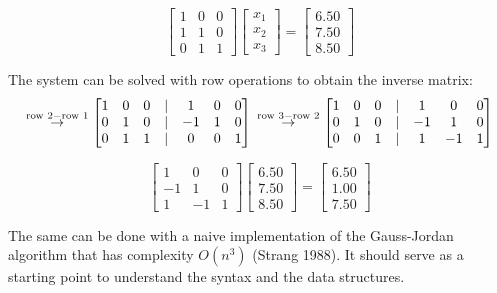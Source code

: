 \begin{equation*}
\begin{bmatrix}
1 & 0 & 0 \\
1 & 1 & 0 \\
0 & 1 & 1
\end{bmatrix}
\begin{bmatrix}
x_1 \\
x_2 \\
x_3
\end{bmatrix}
=
\begin{bmatrix}
6.50 \\
7.50 \\
8.50
\end{bmatrix}
\end{equation*}

The system can be solved with row operations to obtain the inverse matrix:
\begin{equation*}
\overset{\text{row 2} - \text{row 1}}{\rightarrow} \begin{bmatrix}
1 & 0 & 0 & | & 1 & 0 & 0 \\
0 & 1 & 0 & | & -1 & 1 & 0 \\
0 & 1 & 1 & | & 0 & 0 & 1
\end{bmatrix} \newline
\overset{\text{row 3} - \text{row 2}}{\rightarrow} \begin{bmatrix}
1 & 0 & 0 & | & 1 & 0 & 0 \\
0 & 1 & 0 & | & -1 & 1 & 0 \\
0 & 0 & 1 & | & 1 & -1 & 1
\end{bmatrix}
\end{equation*}

\begin{equation*}
\begin{bmatrix}
1 & 0 & 0 \\
-1 & 1 & 0 \\
1 & -1 & 1
\end{bmatrix}
\begin{bmatrix}
6.50 \\
7.50 \\
8.50
\end{bmatrix}
=
\begin{bmatrix}
6.50 \\
1.00 \\
7.50
\end{bmatrix}
\end{equation*}

The same can be done with a naive implementation of the Gauss-Jordan algorithm
that has complexity \(O(n^3)\) (Strang 1988). It should serve as a starting point
to understand the syntax and the data structures.

